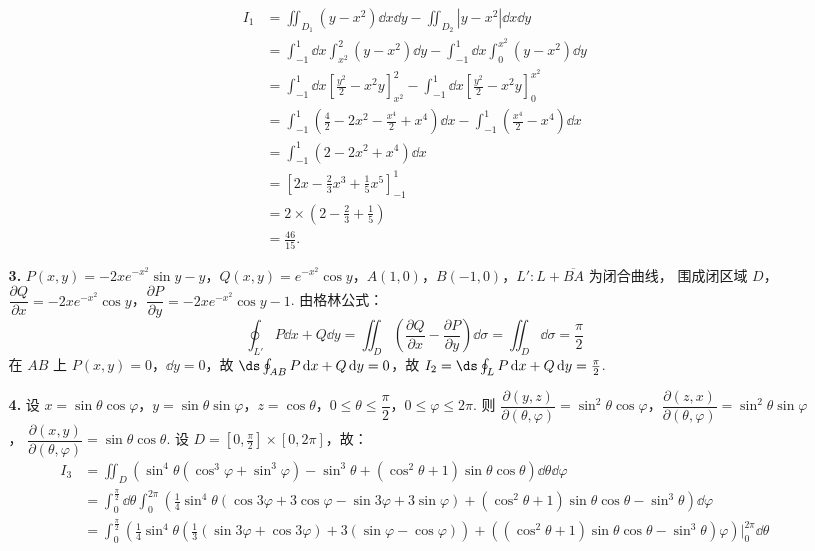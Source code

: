 \documentclass{ctexart}
\begin{document}
\begin{enumerate}
\begin{enumerate}
        \begin{align*}
        I_1
        & =\iint_{D_1}(y-x^2)\dd{x}\dd{y}-\iint_{D_2}|y-x^2|\dd{x}\dd{y} \\
        & =\int_{-1}^1\dd{x}\int_{x^2}^2(y-x^2)\dd{y}-\int_{-1}^1\dd{x}\int_0^{x^2}(y-x^2)\dd{y} \\
        & =\int_{-1}^1\dd{x}\left[\frac{y^2}{2}-x^2y\right]_{x^2}^2-\int_{-1}^1\dd{x}\left[\frac{y^2}{2}-x^2y\right]_0^{x^2} \\
        & =\int_{-1}^1(\frac{4}{2}-2x^2-\frac{x^4}{2}+x^4)\dd{x}-\int_{-1}^1(\frac{x^4}{2}-x^4)\dd{x} \\
        & =\int_{-1}^1(2-2x^2+x^4)\dd{x} \\
        & =\left[2x-\frac{2}{3}x^3+\frac{1}{5}x^5\right]_{-1}^1 \\
        & =2\times\left(2-\frac{2}{3}+\frac{1}{5}\right)\\
        & =\frac{46}{15}.
        \end{align*}
        \item[\textbf{3.}] $P(x,y)=-2xe^{-x^2}\sin y-y$，$Q(x,y)=e^{-x^2}\cos{y}$，$A(1,0)$，$B(-1,0)$，$L':L+\overline{BA}$ 为闭合曲线，
        围成闭区域 $D$，$\dfrac{\partial Q}{\partial x}=-2xe^{-x^2}\cos y$，$\dfrac{\partial P}{\partial y}=-2xe^{-x^2}\cos y-1$.
        由格林公式： $$\oint_{L'}P\dd{x}+Q\dd{y}=\iint_D(\dfrac{\partial Q}{\partial x}-\dfrac{\partial P}{\partial y})\dd{\sigma}=\iint_D \dd{\sigma}=\frac{\pi}{2}$$
        在 $AB$ 上 $P(x,y)=0$，$\dd{y}=0$，故 $\ds\oint_{AB}P\dd{x}+Q\dd{y}=0$，故 $I_2=\ds\oint_{L}P\dd{x}+Q\dd{y}=\frac{\pi}{2}$.
        \item[\textbf{4.}] 设 $x=\sin\theta\cos\varphi$，$y=\sin\theta\sin\varphi$，$z=\cos\theta$，$0\le \theta\le \dfrac{\pi}{2}$，$0\le\varphi\le 2\pi$.
        则 $\dfrac{\partial(y,z)}{\partial(\theta,\varphi)}=\sin^2\theta\cos\varphi$，$\dfrac{\partial(z,x)}{\partial(\theta,\varphi)}=\sin^2\theta\sin\varphi$，
        $\dfrac{\partial(x,y)}{\partial(\theta,\varphi)}=\sin\theta\cos\theta$. 设 $D=[0,\frac{\pi}{2}]\times[0,2\pi]$，故：
        \begin{align*}
        I_3&=\iint_D(\sin^4\theta(\cos^3\varphi+\sin^3\varphi)-\sin^3\theta+(\cos^2\theta+1)\sin\theta\cos\theta)\dd{\theta}\dd{\varphi} \\
        &=\int_0^{\frac{\pi}{2}}\dd{\theta}\int_0^{2\pi}(\frac{1}{4}\sin^4\theta(\cos 3\varphi+3\cos\varphi-\sin 3\varphi+3\sin\varphi)+(\cos^2\theta+1)\sin\theta\cos\theta-\sin^3\theta)\dd{\varphi} \\
        &=\int_0^{\frac{\pi}{2}}(\frac{1}{4}\sin^4\theta(\frac{1}{3}(\sin 3\varphi+\cos 3\varphi)+3(\sin\varphi-\cos\varphi))+((\cos^2\theta+1)\sin\theta\cos\theta-\sin^3\theta)\varphi)\vert_{0}^{2\pi}\dd{\theta} \\

\end{align*}
\end{enumerate}
\end{enumerate}
\end{document}
